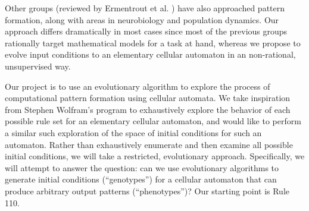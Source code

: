 \documentclass[twocolumn]{article}
\begin{document}
Other groups (reviewed by Ermentrout et al. \cite{Ermentrout:1993ky}) have also approached pattern formation, along with areas in neurobiology and population dynamics.  Our approach differs dramatically in most cases since most of the previous groups rationally target mathematical models for a task at hand, whereas we propose to evolve input conditions to an elementary cellular automaton in an non-rational, unsupervised way. 

Our project is to use an evolutionary algorithm to explore the process of computational pattern formation using cellular automata. We take inspiration from Stephen Wolfram’s program to exhaustively explore the behavior of each possible rule set for an elementary cellular automaton, \cite{Wolfram:2002wq} and would like to perform a similar such exploration of the space of initial conditions for such an automaton. Rather than exhaustively enumerate and then examine all possible initial conditions, we will take a restricted, evolutionary approach. Specifically, we will attempt to answer the question: can we use evolutionary algorithms to generate initial conditions (``genotypes'') for a cellular automaton that can produce arbitrary output patterns (``phenotypes'')? Our starting point is Rule 110. 
\end{document}
